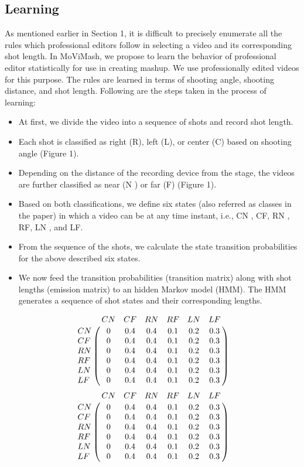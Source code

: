 \documentclass{IEEEtran}
\begin{document}
\subsection{Learning}
As mentioned earlier in Section 1, it is difficult to precisely enumerate all the rules which professional editors follow in selecting a video and its corresponding shot length. In MoViMash, we propose to learn the behavior of professional editor statistically for use in creating mashup. We use professionally edited videos for this purpose. The rules are learned in terms of shooting angle, shooting distance, and shot length. Following are the steps taken in the process of learning:
\begin{itemize}
    \item At first, we divide the video into a sequence of shots and record shot length.
    \item Each shot is classified as right (R), left (L), or center (C) based on shooting angle (Figure 1).
    \item Depending on the distance of the recording device from the stage, the videos are further classified as near (N ) or far (F) (Figure 1).
    \item Based on both classifications, we define six states (also referred as classes in the paper) in which a video can be at any time instant, i.e., CN , CF, RN , RF, LN , and LF.
    \item From the sequence of the shots, we calculate the state transition probabilities for the above described six states.
    \item We now feed the transition probabilities (transition matrix) along with shot lengths (emission matrix) to an hidden Markov model (HMM). The HMM generates a sequence of shot states and their corresponding lengths.
\end{itemize}
\[
  \bordermatrix{  &CN &CF &RN &RF &LN &LF \cr
               CN &0   & 0.4  & 0.4  & 0.1  & 0.2  & 0.3  \cr
               CF  &0   & 0.4  & 0.4  & 0.1  & 0.2  & 0.3   \cr
               RN  &0   & 0.4  & 0.4  & 0.1  & 0.2  & 0.3  \cr
               RF  &0   & 0.4  & 0.4  & 0.1  & 0.2  & 0.3  \cr
               LN  &0   & 0.4  & 0.4  & 0.1  & 0.2  & 0.3   \cr
               LF  &0   & 0.4  & 0.4  & 0.1  & 0.2  & 0.3   \cr
  }
\]
\[
  \bordermatrix{  &CN &CF &RN &RF &LN &LF \cr
               CN &0   & 0.4  & 0.4  & 0.1  & 0.2  & 0.3  \cr
               CF  &0   & 0.4  & 0.4  & 0.1  & 0.2  & 0.3   \cr
               RN  &0   & 0.4  & 0.4  & 0.1  & 0.2  & 0.3  \cr
               RF  &0   & 0.4  & 0.4  & 0.1  & 0.2  & 0.3  \cr
               LN  &0   & 0.4  & 0.4  & 0.1  & 0.2  & 0.3   \cr
               LF  &0   & 0.4  & 0.4  & 0.1  & 0.2  & 0.3   \cr
  }
\]
\end{document}
